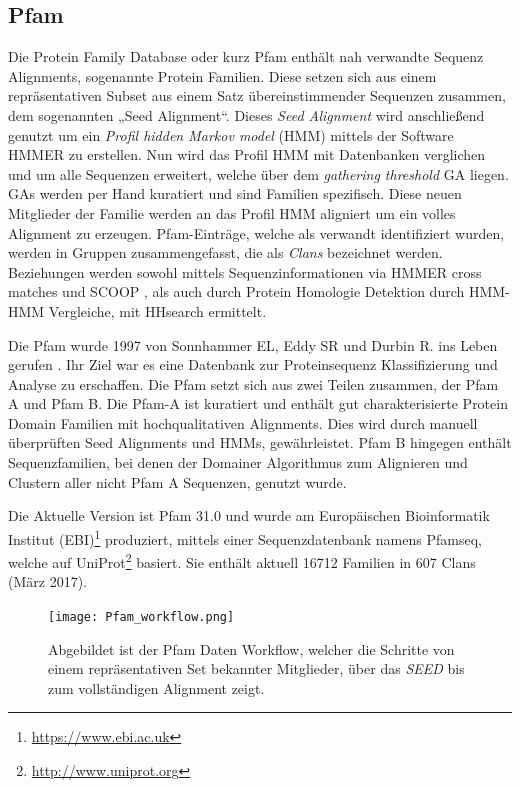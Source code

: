 \subsection{Pfam}

Die Protein Family Database\cite{Finn.2014} oder kurz Pfam enthält nah verwandte Sequenz Alignments, sogenannte Protein Familien. Diese setzen sich aus einem repräsentativen Subset aus einem Satz übereinstimmender Sequenzen zusammen, dem sogenannten „Seed Alignment“. Dieses \emph{Seed Alignment} wird anschließend genutzt um ein \emph{Profil hidden Markov model} (HMM) \cite{Soding.2005} mittels der Software HMMER\cite{Mistry.2013} zu erstellen. Nun wird das Profil HMM mit Datenbanken verglichen und um alle Sequenzen erweitert, welche über dem \emph{gathering threshold} GA liegen. GAs werden per Hand kuratiert und sind Familien spezifisch. Diese neuen Mitglieder der Familie werden an das Profil HMM aligniert um ein volles Alignment zu erzeugen. Pfam-Einträge, welche als verwandt identifiziert wurden, werden in Gruppen zusammengefasst, die als \emph{Clans} bezeichnet werden. Beziehungen werden sowohl mittels Sequenzinformationen via HMMER cross matches und SCOOP \cite{Bateman.2007}, als auch durch Protein Homologie Detektion durch HMM-HMM Vergleiche, mit HHsearch \cite{Fidler.2016} ermittelt.

Die Pfam wurde 1997 von Sonnhammer EL, Eddy SR und Durbin R. ins Leben gerufen \cite{Sonnhammer.1997}. Ihr Ziel war es eine Datenbank zur Proteinsequenz Klassifizierung und Analyse zu erschaffen. Die Pfam setzt sich aus zwei Teilen zusammen, der Pfam A und Pfam B. Die Pfam-A ist kuratiert und enthält gut charakterisierte Protein Domain Familien mit hochqualitativen Alignments. Dies wird durch manuell überprüften Seed Alignments und HMMs, gewährleistet. Pfam B hingegen enthält Sequenzfamilien, bei denen der Domainer Algorithmus zum Alignieren und Clustern aller nicht Pfam A Sequenzen, genutzt wurde. 

Die Aktuelle Version ist Pfam 31.0 und wurde am Europäischen Bioinformatik Institut (EBI)\footnote{\url{https://www.ebi.ac.uk}} produziert, mittels einer Sequenzdatenbank namens Pfamseq, welche auf UniProt\footnote{\url{http://www.uniprot.org}} basiert. Sie enthält aktuell 16712 Familien in 607 Clans (März 2017).
\begin{figure}
\texttt{[image: Pfam\_workflow.png]}
\caption{Abgebildet ist der \ac{Pfam} Daten Workflow, welcher die Schritte von einem repräsentativen Set bekannter Mitglieder, über das \emph{SEED} bis zum vollständigen Alignment zeigt.}
\label{fig:Pfam_workflow}
\end{figure}


